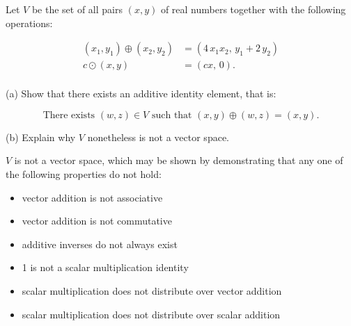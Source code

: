 
\begin{exerciseStatement}


 Let \(V\) be the set of all pairs \((x,y)\) of real numbers together with the following operations: 


\begin{align*} (x_1,y_1)\oplus (x_2,y_2)&= \left(4 \, x_{1} x_{2},\,y_{1} + 2 \, y_{2}\right)  \\c \odot (x,y) &= \left(c x,\,0\right) . \\ \end{align*}
            

 (a) Show that there exists an additive identity element, that is: 

\[\text{There exists }(w,z)\in V\text{ such that }(x,y)\oplus(w,z)=(x,y).
    \]

 (b) Explain why \(V\) nonetheless is not a vector space. 


\end{exerciseStatement}
    
\begin{exerciseAnswer} 


\(V\) is not a vector space, which may be shown by demonstrating that any one of the following properties do not hold: 


\begin{itemize}
\item vector addition is not associative
\item vector addition is not commutative
\item additive inverses do not always exist
\item 1 is not a scalar multiplication identity
\item scalar multiplication does not distribute over vector addition
\item scalar multiplication does not distribute over scalar addition
\end{itemize}
    
\end{exerciseAnswer}
    
